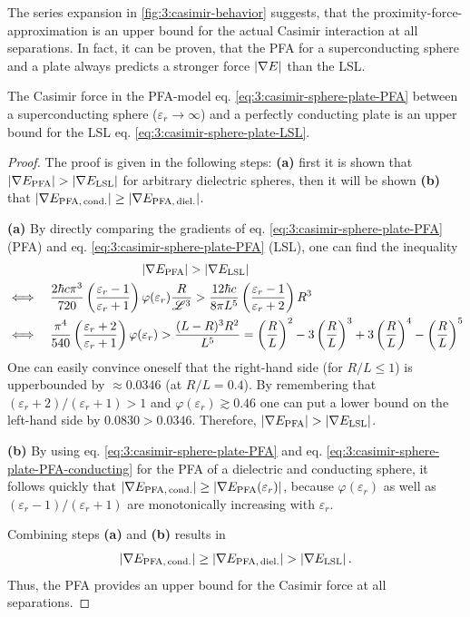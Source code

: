 The series expansion in \cref{fig:3:casimir-behavior} suggests, that the proximity-force-approximation is an upper bound for the actual Casimir interaction at all separations. In fact, it can be proven, that the PFA for a superconducting sphere and a plate always predicts a stronger force $\left\lvert\nabla E\right\rvert$ than the LSL.
\begin{theorem}
  The Casimir force in the PFA-model eq. \eqref{eq:3:casimir-sphere-plate-PFA} between a superconducting sphere ($\varepsilon_r \rightarrow \infty$) and a perfectly conducting plate is an upper bound for the LSL eq. \eqref{eq:3:casimir-sphere-plate-LSL}.
\end{theorem}
\begin{proof}
  The proof is given in the following steps: \textbf{(a)} first it is shown that $\left\lvert\nabla E_\mathrm{PFA}\right\rvert > \left\lvert\nabla E_\mathrm{LSL}\right\rvert$ for arbitrary dielectric spheres, then it will be shown \textbf{(b)} that $\left\lvert\nabla E_\mathrm{PFA,\,cond.}\right\rvert \geq \left\lvert\nabla E_\mathrm{PFA,\,diel.}\right\rvert$.

  \textbf{(a)} By directly comparing the gradients of eq. \eqref{eq:3:casimir-sphere-plate-PFA} (PFA) and eq. \eqref{eq:3:casimir-sphere-plate-PFA} (LSL),  one can find
  the inequality
  \begin{align*}
    &\qquad\qquad\qquad\qquad\qquad\ \ \left\lvert\nabla E_\mathrm{PFA}\right\rvert > \left\lvert\nabla E_\mathrm{LSL}\right\rvert \\
    &\Longleftrightarrow \quad  \frac{2\hbar c \pi^3}{720}\left(\frac{\varepsilon_r - 1}{\varepsilon_r + 1}\right)\varphi(\varepsilon_r)\frac{R}{\mathscr{L}^3} > \frac{12 \hbar c}{8\pi L^5}\left(\frac{\varepsilon_r - 1}{\varepsilon_r + 2}\right)R^3 \\
    &\Longleftrightarrow \quad \frac{\pi^4}{540}\left(\frac{\varepsilon_r + 2}{\varepsilon_r + 1}\right)\varphi(\varepsilon_r) > \frac{(L-R)^3 R^2}{L^5} = \left(\frac{R}{L}\right)^2 - 3\left(\frac{R}{L}\right)^3 + 3\left(\frac{R}{L}\right)^4 - \left(\frac{R}{L}\right)^5
  \end{align*}
  One can easily convince oneself that the right-hand side (for $R/L \leq 1$) is upperbounded by $\approx 0.0346$ (at $R/L = 0.4$). By remembering that $(\varepsilon_r + 2)/(\varepsilon_r + 1) > 1$ and $\varphi(\varepsilon_r) \gtrsim 0.46$ one can put a lower bound on the left-hand side by $0.0830 > 0.0346$. Therefore, $\left\lvert\nabla E_\mathrm{PFA}\right\rvert > \left\lvert\nabla E_\mathrm{LSL}\right\rvert$.

  \textbf{(b)} By using eq. \eqref{eq:3:casimir-sphere-plate-PFA} and eq. \eqref{eq:3:casimir-sphere-plate-PFA-conducting} for the PFA of a dielectric and conducting sphere, it follows quickly that $\left\lvert\nabla E_\mathrm{PFA,\,cond.}\right\rvert \geq \left\lvert\nabla E_\mathrm{PFA}(\varepsilon_r)\right\rvert$, because $\varphi(\varepsilon_r)$ as well as $(\varepsilon_r - 1)/(\varepsilon_r + 1)$ are monotonically increasing with $\varepsilon_r$. 

  Combining steps \textbf{(a)} and \textbf{(b)} results in
  \begin{equation}
    \left\lvert\nabla E_\mathrm{PFA,\,cond.}\right\rvert \geq \left\lvert\nabla E_\mathrm{PFA,\,diel.}\right\rvert > \left\lvert\nabla E_\mathrm{LSL}\right\rvert .
  \end{equation}
  Thus, the PFA provides an upper bound for the Casimir force at all separations.
\end{proof}
